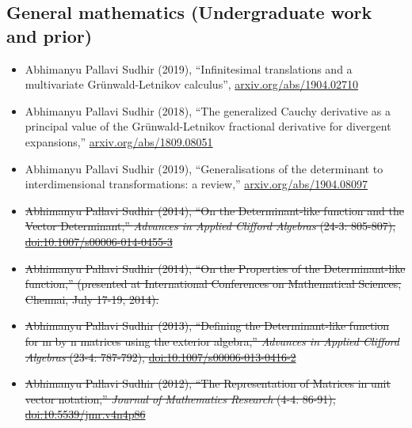 \documentclass{article}
\newcommand{\disown}[1]{\sout{#1}}
\newcommand{\archive}{\color{lightgray}}
\begin{document}
{\archive

\subsection*{General mathematics (Undergraduate work and prior)}

\begin{itemize}

    \item
          Abhimanyu Pallavi Sudhir (2019),
          ``Infinitesimal translations and a multivariate Gr\"unwald-Letnikov calculus'', \href{https://arxiv.org/abs/1904.02710}{arxiv.org/abs/1904.02710}

    \item
          Abhimanyu Pallavi Sudhir (2018),
          ``The generalized Cauchy derivative as a principal value of the Gr\"unwald-Letnikov fractional derivative for divergent expansions,'' \href{https://arxiv.org/abs/1809.08051}{arxiv.org/abs/1809.08051}

    \item
          Abhimanyu Pallavi Sudhir (2019),
          ``Generalisations of the determinant to interdimensional transformations: a review,'' \href{https://arxiv.org/abs/1904.08097}{arxiv.org/abs/1904.08097}

    \item
          \disown{Abhimanyu Pallavi Sudhir (2014),
              ``On the Determinant-like function and the Vector Determinant,''
              \emph{Advances in Applied Clifford Algebras} (24-3: 805-807), \href{https://link.springer.com/article/10.1007/s00006-014-0455-3}{doi:10.1007/s00006-014-0455-3}}

    \item
          \disown{Abhimanyu Pallavi Sudhir (2014),
              ``On the Properties of the Determinant-like function,''
              (presented at International Conferences on Mathematical Sciences, Chennai, July 17-19, 2014).}

    \item
          \disown{Abhimanyu Pallavi Sudhir (2013),
              ``Defining the Determinant-like function for m by n matrices using the exterior algebra,''
              \emph{Advances in Applied Clifford Algebras} (23-4: 787-792),
              \href{https://link.springer.com/article/10.1007/s00006-013-0416-2}{doi:10.1007/s00006-013-0416-2}}

    \item
          \disown{Abhimanyu Pallavi Sudhir (2012),
              ``The Representation of Matrices in unit vector notation,''
              \emph{Journal of Mathematics Research} (4-4: 86-91),
              \href{https://dx.doi.org/10.5539/jmr.v4n4p86}{doi:10.5539/jmr.v4n4p86}}


\end{itemize}}
\end{document}
